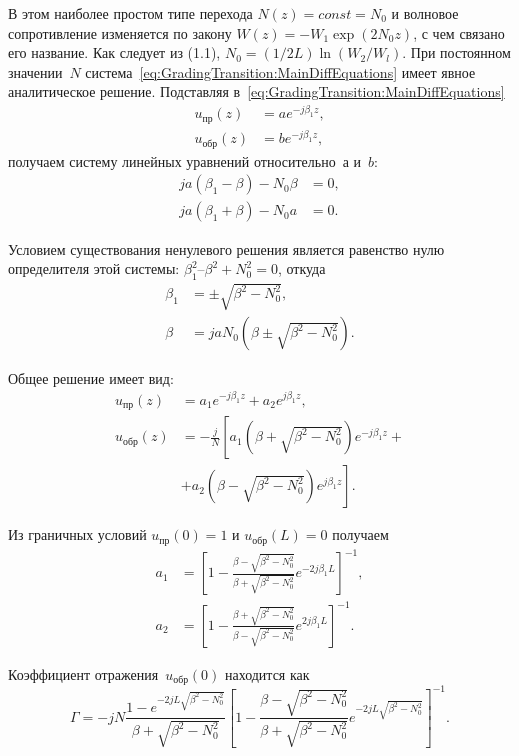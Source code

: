 В этом наиболее простом типе перехода $N(z)=const=N_0$ и волновое
сопротивление изменяется по закону $W(z)= - W_1 \exp (2 N_0 z)$, с чем связано
его название. Как следует из (1.1), $N_0 = (1/2L) \ln (W_2/W_l)$. При постоянном
значении~$N$ система~\eqref{eq:GradingTransition:MainDiffEquations} имеет явное
аналитическое решение. Подставляя в~\eqref{eq:GradingTransition:MainDiffEquations}
\begin{align*}
    u_{пр}(z)  &= a e^{-j\beta_1 z}, \\
    u_{обр}(z) &= b e^{-j\beta_1 z},
\end{align*}
получаем систему линейных уравнений относительно~$а$ и~$b$:
\begin{align*}
    ja(\beta_1 - \beta) - N_0\beta &= 0, \\
    ja(\beta_1 + \beta) - N_0 a &= 0.
\end{align*}

Условием существования ненулевого решения является равенство нулю определителя
этой системы: $\beta_1^2–\beta^2+N_0^2=0$, откуда
\begin{align*}
    \beta_1 &= \pm \sqrt{\beta^2 - N_0^2}, \\
    \beta   &= j a N_0 \left( \beta \pm \sqrt{\beta^2-N_0^2} \right).
\end{align*}

Общее решение имеет вид:
\begin{align*}
    u_{пр}(z)  &= a_1 e^{-j\beta_1 z} + a_2 e^{j\beta_1 z}, \\
    u_{обр}(z) &= -\frac{j}{N}
    \left[
        a_1 \left( \beta + \sqrt{\beta^2-N_0^2} \right) e^{-j\beta_1 z}
    \right. + \\ &+
    \left.
        a_2 \left( \beta - \sqrt{\beta^2-N_0^2} \right) e^{j\beta_1 z}
    \right].
\end{align*}

Из граничных условий $u_{пр}(0)=1$ и $u_{обр}(L)=0$ получаем
\begin{align*}
    a_1 &=
    \left[
        1 - \frac{\beta-\sqrt{\beta^2-N_0^2}}{\beta+\sqrt{\beta^2-N_0^2}}
        e^{-2j\beta_1 L}
    \right]^{-1}, \\
    a_2 &=
    \left[
        1 - \frac{\beta+\sqrt{\beta^2-N_0^2}}{\beta-\sqrt{\beta^2-N_0^2}}
        e^{2j\beta_1 L}
    \right]^{-1}.
\end{align*}

Коэффициент отражения~$u_{обр}(0)$ находится как
\begin{equation}
    \label{eq:GradingTransition:ReflectionCoeff}
    \Gamma = -j N
        \frac{1-e^{-2jL\sqrt{\beta^2-N_0^2}}}{\beta+\sqrt{\beta^2-N_0^2}}
        \left[ 1 -
            \frac{\beta-\sqrt{\beta^2-N_0^2}}{\beta+\sqrt{\beta^2-N_0^2}}
            e^{-2jL\sqrt{\beta^2-N_0^2}}
        \right]^{-1}.
\end{equation}

